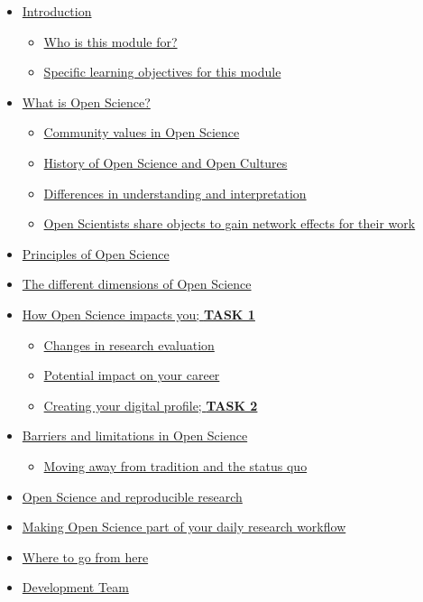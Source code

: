 \documentclass[]{book}
\providecommand{\tightlist}{%
  \setlength{\itemsep}{0pt}\setlength{\parskip}{0pt}}
\begin{document}
\begin{itemize}
\tightlist
\item
  \protect\hyperlink{introduction}{Introduction}

  \begin{itemize}
  \tightlist
  \item
    \protect\hyperlink{who_for}{Who is this module for?}
  \item
    \protect\hyperlink{objectives}{Specific learning objectives for this module}
  \end{itemize}
\item
  \protect\hyperlink{what_is}{What is Open Science?}

  \begin{itemize}
  \tightlist
  \item
    \protect\hyperlink{values}{Community values in Open Science}
  \item
    \protect\hyperlink{cultures}{History of Open Science and Open Cultures}
  \item
    \protect\hyperlink{interpretation}{Differences in understanding and interpretation}
  \item
    \protect\hyperlink{network_effects}{Open Scientists share objects to gain network effects for their work}
  \end{itemize}
\item
  \protect\hyperlink{principles}{Principles of Open Science}
\item
  \protect\hyperlink{dimensions}{The different dimensions of Open Science}
\item
  \protect\hyperlink{impacts}{How Open Science impacts you; \textbf{TASK 1}}

  \begin{itemize}
  \tightlist
  \item
    \protect\hyperlink{evaluation}{Changes in research evaluation}
  \item
    \protect\hyperlink{career}{Potential impact on your career}
  \item
    \protect\hyperlink{profile}{Creating your digital profile; \textbf{TASK 2}}
  \end{itemize}
\item
  \protect\hyperlink{barriers}{Barriers and limitations in Open Science}

  \begin{itemize}
  \tightlist
  \item
    \protect\hyperlink{tradition}{Moving away from tradition and the status quo}
  \end{itemize}
\item
  \protect\hyperlink{reproducible}{Open Science and reproducible research}
\item
  \protect\hyperlink{workflow}{Making Open Science part of your daily research workflow}
\item
  \protect\hyperlink{future}{Where to go from here}
\item
  \protect\hyperlink{development_team}{Development Team}
\end{itemize}
\end{document}
